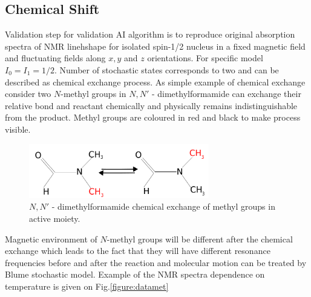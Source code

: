 \subsection{Chemical Shift}\label{blumeinitialmodel}
Validation step for validation AI algorithm is to reproduce original absorption spectra of NMR linehshape for isolated spin-1/2 nucleus in a fixed magnetic field and fluctuating fields along $x,y$ and $z$ orientations. For specific model $I_0=I_1=1/2$. Number of stochastic states corresponds to two and can be described as chemical exchange process. As simple example of chemical exchange consider two $N$-methyl groups in $N,N'$ - dimethylformamide can exchange their relative bond and reactant chemically and physically remains indistinguishable from the product. Methyl groups are coloured in red and black to make process visible.       
\begin{figure}[h!]
\centering
\includegraphics[width=0.7\textwidth]{figures/chap2/methil.png}
\caption{$N,N'$ -
dimethylformamide chemical exchange of methyl groups in active moiety.}
\label{figure:methyl}
\end{figure}
Magnetic environment of $N$-methyl groups will be different after the chemical exchange which leads to the fact that they will have different resonance frequencies before and after the reaction and molecular motion can be treated by Blume stochastic model. Example of the NMR spectra dependence on temperature is given on Fig.\ref{figure:datamet} 
